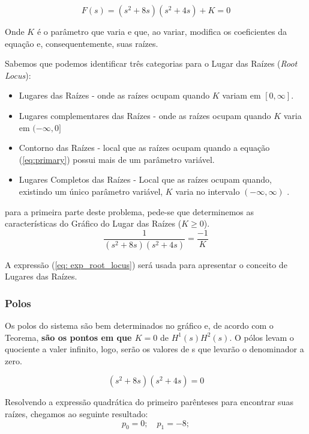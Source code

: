 \documentclass[a4paper, 12pt]{article}
\begin{document}
\begin{equation}\label{eq:primary}
    F(s) = (s^2+8s)(s^2+4s)+K = 0
\end{equation}

Onde $K$ é o parâmetro que varia e que, ao variar, modifica os coeficientes da equação e, consequentemente, suas raízes.

Sabemos que podemos identificar três categorias para o Lugar das Raízes (\textit{Root Locus}):

\begin{itemize}
    \item Lugares das Raízes - onde as raízes ocupam quando $K$ variam em $[0, \infty]$.
    \item Lugares complementares das Raízes - onde as raízes ocupam quando $K$ varia em $(-\infty, 0]$ 
    \item Contorno das Raízes - local que as raízes ocupam quando a equação (\ref{eq:primary}) possui mais de um parâmetro variável. 
    \item Lugares Completos das Raízes - Local que as raízes ocupam quando, existindo um único parâmetro variável, $K$ varia no intervalo $(−\infty, \infty)$ . 
\end{itemize}


para a primeira parte deste problema, pede-se que determinemos as características do Gráfico do Lugar das Raízes ($K\geq0$).
\begin{equation}\label{eq: exp_root_locus}
    \frac{1}{(s^2+8s)(s^2+4s)}=\frac{-1}{K}
\end{equation}

A expressão (\ref{eq: exp_root_locus}) será usada para apresentar o conceito de Lugares das Raízes.


\subsubsection{Polos}
Os polos do sistema são bem determinados no gráfico e, de acordo com o Teorema, \textbf{são os pontos em que $K=0$} de $H^1(s)H^2(s)$. O pólos levam o quociente a valer infinito, logo, serão os valores de s que levarão o denominador a zero.

\begin{equation}
    (s^2+8s)(s^2+4s)=0
\end{equation}

Resolvendo a expressão quadrática do primeiro parênteses para encontrar suas raízes, chegamos ao seguinte resultado:
\begin{equation}\label{eq:polos1}
    p_{0}=0; \quad     p_{1}=-8;
\end{equation}
\end{document}
